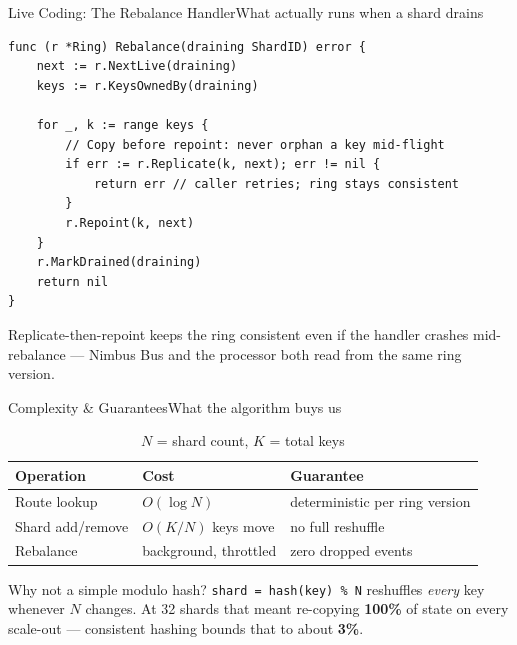 \documentclass[aspectratio=169,10pt]{beamer}
\begin{document}
\begin{frame}[fragile]{Live Coding: The Rebalance Handler}{What actually runs when a shard drains}
  \begin{lstlisting}[style=nimbus]
func (r *Ring) Rebalance(draining ShardID) error {
    next := r.NextLive(draining)
    keys := r.KeysOwnedBy(draining)

    for _, k := range keys {
        // Copy before repoint: never orphan a key mid-flight
        if err := r.Replicate(k, next); err != nil {
            return err // caller retries; ring stays consistent
        }
        r.Repoint(k, next)
    }
    r.MarkDrained(draining)
    return nil
}
  \end{lstlisting}
  \vspace{0.3em}
  {\small\color{inkGray} Replicate-then-repoint keeps the ring consistent even if
  the handler crashes mid-rebalance --- Nimbus Bus and the processor both read
  from the same ring version.}
\end{frame}

\begin{frame}{Complexity \& Guarantees}{What the algorithm buys us}
  \begin{table}
    \small
    \begin{tabular}{@{}lll@{}}
      \toprule
      \textbf{Operation} & \textbf{Cost} & \textbf{Guarantee} \\
      \midrule
      Route lookup & $O(\log N)$ & deterministic per ring version \\
      Shard add/remove & $O(K/N)$ keys move & no full reshuffle \\
      Rebalance & background, throttled & zero dropped events \\
      \bottomrule
    \end{tabular}
    \caption{$N$ = shard count, $K$ = total keys}
  \end{table}
  \vspace{0.6em}
  \begin{statbox}{Why not a simple modulo hash?}
    \texttt{shard = hash(key) \% N} reshuffles \emph{every} key whenever $N$
    changes. At 32 shards that meant re-copying \textbf{100\%} of state on every
    scale-out --- consistent hashing bounds that to about \textbf{3\%}.
  \end{statbox}
\end{frame}
\end{document}
